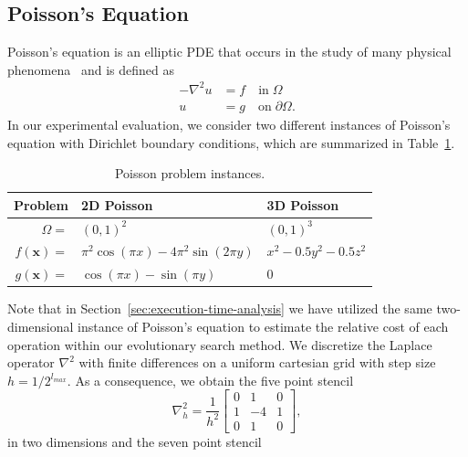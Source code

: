 \subsection{Poisson's Equation}
\label{sec:poisson-equation}
Poisson's equation is an elliptic PDE that occurs in the study of many physical phenomena~\cite{folland2020introduction} and is defined as
\begin{equation}
	\begin{split}
		-\nabla^{2} u & = f \quad \text{in} \; \Omega \\
		u & = g \quad \text{on} \; \partial \Omega.
	\end{split}
	\label{eq:poisson}
\end{equation}
In our experimental evaluation, we consider two different instances of Poisson's equation with Dirichlet boundary conditions, which are summarized in Table~\ref{table:poisson-problems}.
\begin{table}
	\begin{tabular}{r l l}
		\toprule
		Problem & 2D Poisson & 3D Poisson \\
		\midrule
		$\Omega = $ & $ (0, 1)^2$ & $(0, 1)^3$ \\
		\midrule
		$f(\bm{x}) = $ & $\pi^2 \cos(\pi x) - 4 \pi^2 \sin(2 \pi y)$ & $x^2 - 0.5 y^2 - 0.5 z^2$ \\
		\midrule
		$g(\bm{x}) = $ & $\cos(\pi x) - \sin(\pi y)$ & $0$ \\
		\bottomrule
	\end{tabular}
	\caption{Poisson problem instances.}
	\label{table:poisson-problems}
\end{table}
Note that in Section~\ref{sec:execution-time-analysis} we have utilized the same two-dimensional instance of Poisson's equation to estimate the relative cost of each operation within our evolutionary search method.
We discretize the Laplace operator $\nabla^{2}$ with finite differences on a uniform cartesian grid with step size $h = 1/2^{l_{max}}$.
As a consequence, we obtain the five point stencil
\begin{equation*}
	\nabla^2_h = 
	\frac{1}{h^2} \begin{bmatrix}
		0 & 1 & 0\\
		1 & -4 & 1 \\
		0 & 1 & 0  
	\end{bmatrix},
\end{equation*}
in two dimensions and the seven point stencil

